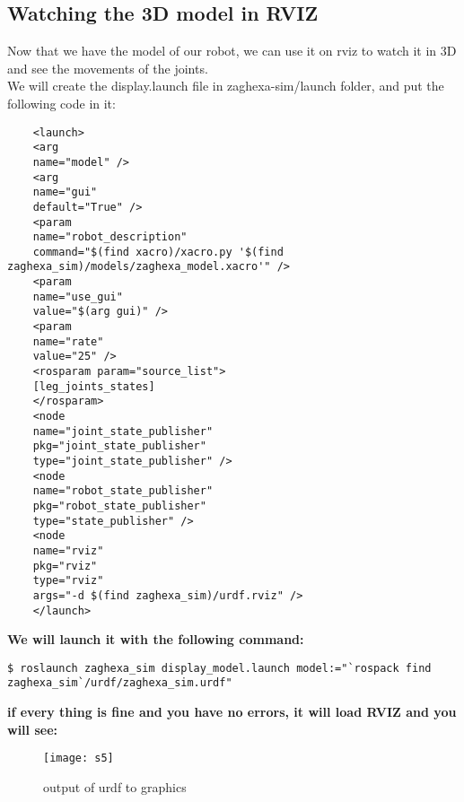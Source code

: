 \documentclass[a4paper]{article}
\begin{document}
\subsection{Watching the 3D model in RVIZ}
Now that we have the model of our robot, we can use it on rviz to watch it in 3D
and see the movements of the joints.\\
We will create the display.launch file in zaghexa-sim/launch folder,
and put the following code in it:
\begin{lstlisting}
	<launch>
	<arg
	name="model" />
	<arg
	name="gui"
	default="True" />
	<param
	name="robot_description"
	command="$(find xacro)/xacro.py '$(find zaghexa_sim)/models/zaghexa_model.xacro'" />
	<param
	name="use_gui"
	value="$(arg gui)" />
	<param
	name="rate"
	value="25" />
	<rosparam param="source_list">
	[leg_joints_states]
	</rosparam>
	<node
	name="joint_state_publisher"
	pkg="joint_state_publisher"
	type="joint_state_publisher" />
	<node
	name="robot_state_publisher"
	pkg="robot_state_publisher"
	type="state_publisher" />
	<node
	name="rviz"
	pkg="rviz"
	type="rviz"
	args="-d $(find zaghexa_sim)/urdf.rviz" />
	</launch>
\end{lstlisting}	
\textbf{We will launch it with the following command:}
\begin{lstlisting}
$ roslaunch zaghexa_sim display_model.launch model:="`rospack find
zaghexa_sim`/urdf/zaghexa_sim.urdf"
\end{lstlisting}
\textbf{if every thing is fine and you have no errors, it will load RVIZ and you will see:}
\begin{figure}[h]
	\centering
	\texttt{[image: s5]}
	\caption{output of urdf to graphics}
	\label{figure :s5}
\end{figure}
\end{document}
